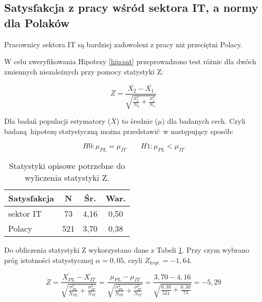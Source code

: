 \subsection{Satysfakcja z pracy wśród sektora IT, a normy dla Polaków}

\begin{hyp}
  Pracownicy sektora IT są bardziej zadowoleni z pracy niż przeciętni Polacy.
  \label{hip:sat}
\end{hyp}

W celu zweryfikowania Hipotezy \ref{hip:sat} przeprowadzono test różnic dla dwóch zmiennych niezależnych przy pomocy statystyki Z:

\begin{equation}
  Z = \frac{\overline{X_2} - \overline{X_1}}{\sqrt{\frac{\sigma^2_2}{N_2}+\frac{\sigma^2_1}{N_1}}}
\end{equation}

Dla badań populacji estymatory ($\overline{X}$) to średnie ($\mu$) dla badanych cech. Czyli badaną hipotezę statystyczną można przedstawić w następujący sposób:

\begin{equation}
  H0: \mu_{PL} = \mu_{IT} \qquad H1: \mu_{PL} < \mu_{IT}
\end{equation}

\begin{table}[h!b]
  \begin{center}
    \begin{tabular}{l | c c c }
      Satysfakcja & N & Śr. & War. \\ \hline
      sektor IT & 73 & 4,16 & 0,50 \\
      Polacy & 521 & 3,70 & 0,38 \\
    \end{tabular}
  \end{center}
  \caption{Statystyki opisowe potrzebne do wyliczenia statystyki Z.}
  \label{tab:jss-norms-data}
\end{table}

Do obliczenia statystyki Z wykorzystano dane z Tabeli \ref{tab:jss-norms-data}. Przy czym wybrano próg istotności statystycznej $\alpha = 0,05$, czyli $Z_{kryt.} = -1,64$.

\begin{equation}
  Z = \frac{\overline{X_{PL}} - \overline{X_{IT}}}{\sqrt{\frac{\sigma^2_{PL}}{N_{PL}}+\frac{\sigma^2_{IT}}{N_{IT}}}} = \frac{\mu_{PL} - \mu_{IT}}{\sqrt{\frac{\sigma^2_{PL}}{N_{PL}}+\frac{\sigma^2_{IT}}{N_{IT}}}} = \frac{3,70 - 4,16}{\sqrt{\frac{0,38}{521}+\frac{0,50}{73}}} = -5,29 
\end{equation}

